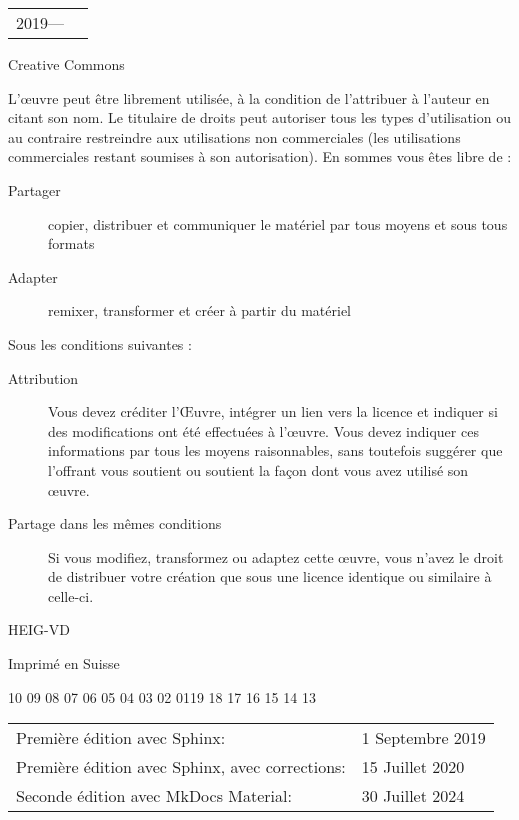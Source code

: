 
\begingroup
\footnotesize
\setlength{\parindent}{0pt}
\setlength{\parskip}{\baselineskip}

\begin{tabular}{@{} l l}
  \textcopyright{} 2019\:---\:2024 & \author \\
\end{tabular}

Creative Commons \par
{}

L'œuvre peut être librement utilisée, à la condition de l'attribuer à l'auteur en citant son nom. Le titulaire de droits peut autoriser tous les types d'utilisation ou au contraire restreindre aux utilisations non commerciales (les utilisations commerciales restant soumises à son autorisation). En sommes vous êtes libre de :

\begin{description}
  \item[Partager] copier, distribuer et communiquer le matériel par tous moyens et sous tous formats
  \item[Adapter] remixer, transformer et créer à partir du matériel
\end{description}

Sous les conditions suivantes :

\begin{description}
  \item[Attribution] Vous devez créditer l'Œuvre, intégrer un lien vers la licence et indiquer si des modifications ont été effectuées à l'œuvre. Vous devez indiquer ces informations par tous les moyens raisonnables, sans toutefois suggérer que l'offrant vous soutient ou soutient la façon dont vous avez utilisé son œuvre.
  \item[Partage dans les mêmes conditions] Si vous modifiez, transformez ou adaptez cette œuvre, vous n'avez le droit de distribuer votre création que sous une licence identique ou similaire à celle-ci.
\end{description}

HEIG-VD

Imprimé en Suisse
\vfil
\begin{center}
  10 09 08 07 06 05 04 03 02 01\hspace{2em}19 18 17 16 15 14 13
\end{center}
\begin{center}
  \begin{tabular}{ll}
    Première édition avec Sphinx:                   & 1 Septembre 2019 \\
    Première édition avec Sphinx, avec corrections: & 15 Juillet 2020  \\
    Seconde édition avec MkDocs Material:           & 30 Juillet 2024  \\
  \end{tabular}
\end{center}
\vfil
\endgroup